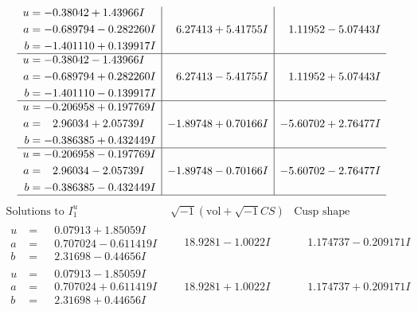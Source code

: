 \documentclass[1p]{elsarticle_modified}
\theoremstyle{definition}
\newcommand{\I}{\sqrt{-1}}
\begin{document}
$$\begin{array}{c|c|c}
\begin{aligned}
u &= -0.38042 + 1.43966 I \\
a &= -0.689794 - 0.282260 I \\
b &= -1.401110 + 0.139917 I\end{aligned}
 & \phantom{-}6.27413 + 5.41755 I & \phantom{-}1.11952 - 5.07443 I \\ \hline\begin{aligned}
u &= -0.38042 - 1.43966 I \\
a &= -0.689794 + 0.282260 I \\
b &= -1.401110 - 0.139917 I\end{aligned}
 & \phantom{-}6.27413 - 5.41755 I & \phantom{-}1.11952 + 5.07443 I \\ \hline\begin{aligned}
u &= -0.206958 + 0.197769 I \\
a &= \phantom{-}2.96034 + 2.05739 I \\
b &= -0.386385 + 0.432449 I\end{aligned}
 & -1.89748 + 0.70166 I & -5.60702 + 2.76477 I \\ \hline\begin{aligned}
u &= -0.206958 - 0.197769 I \\
a &= \phantom{-}2.96034 - 2.05739 I \\
b &= -0.386385 - 0.432449 I\end{aligned}
 & -1.89748 - 0.70166 I & -5.60702 - 2.76477 I\\
 \hline 
 \end{array}$$\newpage$$\begin{array}{c|c|c}  
\text{Solutions to }I^u_{1}& \I (\text{vol} + \sqrt{-1}CS) & \text{Cusp shape}\\
 \hline 
\begin{aligned}
u &= \phantom{-}0.07913 + 1.85059 I \\
a &= \phantom{-}0.707024 - 0.611419 I \\
b &= \phantom{-}2.31698 - 0.44656 I\end{aligned}
 & \phantom{-}18.9281 - 1.0022 I & \phantom{-}1.174737 - 0.209171 I \\ \hline\begin{aligned}
u &= \phantom{-}0.07913 - 1.85059 I \\
a &= \phantom{-}0.707024 + 0.611419 I \\
b &= \phantom{-}2.31698 + 0.44656 I\end{aligned}
 & \phantom{-}18.9281 + 1.0022 I & \phantom{-}1.174737 + 0.209171 I \\ \hline\begin{aligned}

\end{aligned}
\end{array}$$
\end{document}
